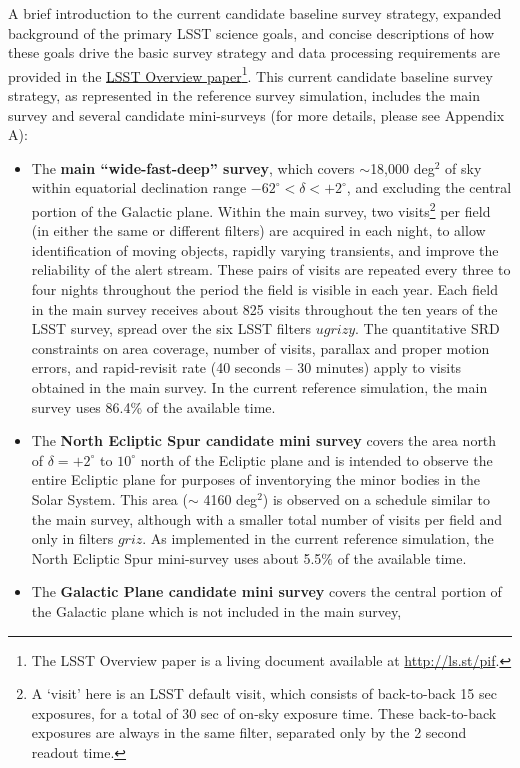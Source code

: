 \documentclass[DM,lsstdraft,toc,usenatbib]{lsstdoc}
\begin{document}
A brief introduction to the current candidate baseline survey strategy, expanded background of the primary LSST science 
goals, and concise descriptions of how these goals drive the basic survey strategy and data processing
requirements are provided in the \href{http://ls.st/pif}{LSST Overview paper}\footnote{The LSST Overview 
paper is a living document available at \href{http://ls.st/pif}{http://ls.st/pif}.}.
This current candidate baseline survey strategy, as represented in the reference survey simulation, includes the main survey and
several candidate mini-surveys (for more details, please see Appendix A): 
\begin{itemize}
\item The {\bf main ``wide-fast-deep'' survey}, which covers $\sim$18,000 deg$^2$ of sky within equatorial declination
range $-62^\circ < \delta < +2^\circ$, and excluding the central portion of the Galactic 
plane. Within the main survey, two visits\footnote{A `visit' here is an LSST default visit, which 
consists of back-to-back 15 sec exposures, for a total of 30 sec of on-sky exposure time. These back-to-back exposures are always
in the same filter, separated only by the 2 second readout time.} 
per field (in either the same or different filters) are acquired in each night, to allow identification of moving objects, rapidly varying transients, and improve
the reliability of the alert stream. These pairs of visits are repeated every three to four nights throughout the period the field is visible in each year. Each
field in the main survey receives about 825 visits throughout the ten years of the LSST survey, spread over the six LSST filters 
$ugrizy$. The quantitative SRD constraints on area coverage, number of visits, parallax and proper motion errors, and 
rapid-revisit rate (40 seconds -- 30 minutes) apply to visits obtained in the main survey. 
In the current reference simulation, the main survey uses 86.4\% of the available time.
\item The {\bf North Ecliptic Spur candidate mini survey} covers the area north of $\delta = +2^\circ$ to $10^\circ$ north of the Ecliptic plane
and is intended to observe the entire Ecliptic plane for purposes of inventorying the minor bodies in the Solar System. This area ($\sim$ 4160 deg$^2$) 
is observed on a schedule similar to the main survey, although with a smaller total number of visits per field and only in filters $griz$. 
As implemented in the current reference simulation, the North Ecliptic Spur mini-survey uses about 5.5\% of the available time. 
\item The {\bf Galactic Plane candidate mini survey} covers the central portion of the Galactic plane which is not included in the main survey, 

\end{itemize}
\end{document}
